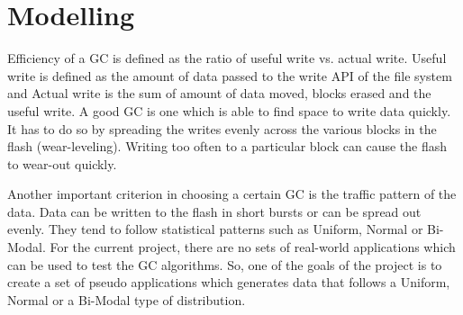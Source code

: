 \section{Modelling}
	Efficiency of a GC is defined as the ratio of useful write vs. actual write. Useful write is defined as the amount of data passed to the write API of the file system and Actual write is the sum of amount of data moved, blocks erased and the useful write. A good GC is one which is able to find space to write data quickly. It has to do so by spreading the writes evenly across the various blocks in the flash (wear-leveling). Writing too often to a particular block can cause the flash to wear-out quickly. 

	Another important criterion in choosing a certain GC is the traffic pattern of the data. Data can be written to the flash in short bursts or can be spread out evenly. They tend to follow statistical patterns such as Uniform, Normal or Bi-Modal. For the current project, there are no sets of real-world applications which can be used to test the GC algorithms. So, one of the goals of the project is to create a set of pseudo applications which generates data that follows a Uniform, Normal or a Bi-Modal type of distribution.

